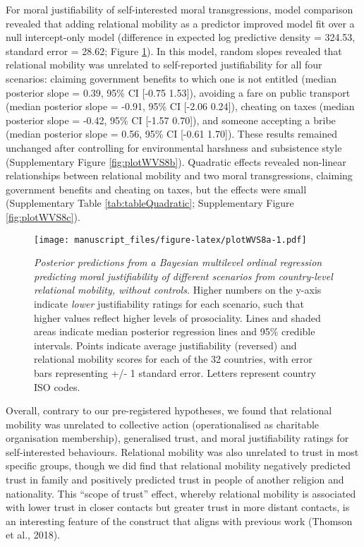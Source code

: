 \documentclass[
  man,floatsintext]{apa6}
\begin{document}
For moral justifiability of self-interested moral transgressions, model comparison revealed that adding relational mobility as a predictor improved model fit over a null intercept-only model (difference in expected log predictive density = 324.53, standard error = 28.62; Figure \ref{fig:plotWVS8a}). In this model, random slopes revealed that relational mobility was unrelated to self-reported justifiability for all four scenarios: claiming government benefits to which one is not entitled (median posterior slope = 0.39, 95\% CI {[}-0.75 1.53{]}), avoiding a fare on public transport (median posterior slope = -0.91, 95\% CI {[}-2.06 0.24{]}), cheating on taxes (median posterior slope = -0.42, 95\% CI {[}-1.57 0.70{]}), and someone accepting a bribe (median posterior slope = 0.56, 95\% CI {[}-0.61 1.70{]}). These results remained unchanged after controlling for environmental harshness and subsistence style (Supplementary Figure \ref{fig:plotWVS8b}). Quadratic effects revealed non-linear relationships between relational mobility and two moral transgressions, claiming government benefits and cheating on taxes, but the effects were small (Supplementary Table \ref{tab:tableQuadratic}; Supplementary Figure \ref{fig:plotWVS8c}).



\begin{figure}
\centering
\texttt{[image: manuscript\_files/figure-latex/plotWVS8a-1.pdf]}
\caption{\label{fig:plotWVS8a}\emph{Posterior predictions from a Bayesian multilevel ordinal regression predicting moral justifiability of different scenarios from country-level relational mobility, without controls.} Higher numbers on the y-axis indicate \emph{lower} justifiability ratings for each scenario, such that higher values reflect higher levels of prosociality. Lines and shaded areas indicate median posterior regression lines and 95\% credible intervals. Points indicate average justifiability (reversed) and relational mobility scores for each of the 32 countries, with error bars representing +/- 1 standard error. Letters represent country ISO codes.}
\end{figure}

Overall, contrary to our pre-registered hypotheses, we found that relational mobility was unrelated to collective action (operationalised as charitable organisation membership), generalised trust, and moral justifiability ratings for self-interested behaviours. Relational mobility was also unrelated to trust in most specific groups, though we did find that relational mobility negatively predicted trust in family and positively predicted trust in people of another religion and nationality. This ``scope of trust'' effect, whereby relational mobility is associated with lower trust in closer contacts but greater trust in more distant contacts, is an interesting feature of the construct that aligns with previous work (Thomson et al., 2018).
\end{document}
